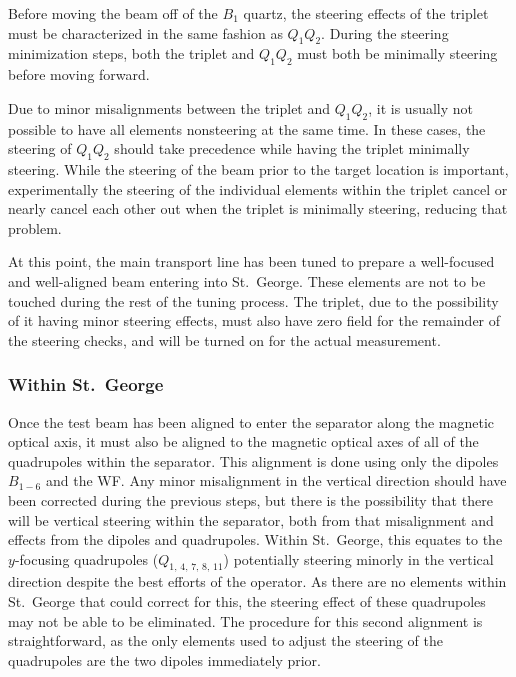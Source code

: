 Before moving the beam off of the $B_1$ quartz, the steering effects of
the triplet must be characterized in the same fashion as $Q_1Q_2$.
During the steering minimization steps, both the triplet and $Q_1Q_2$
must both be minimally steering before moving forward.

Due to minor misalignments between the triplet and $Q_1Q_2$, it is
usually not possible to have all elements nonsteering at the same time.
In these cases, the steering of $Q_1Q_2$ should take precedence while
having the triplet minimally steering. While the steering of the beam
prior to the target location is important, experimentally the steering
of the individual elements within the triplet cancel or nearly cancel
each other out when the triplet is minimally steering, reducing that
problem.

At this point, the main transport line has been tuned to prepare a
well-focused and well-aligned beam entering into St.\ George. These
elements are not to be touched during the rest of the tuning process.
The triplet, due to the possibility of it having minor steering effects,
must also have zero field for the remainder of the steering checks, and
will be turned on for the actual measurement.

\subsubsection{Within St.\ George}
\label{sec:tuning_stg}

Once the test beam has been aligned to enter the separator along the
magnetic optical axis, it must also be aligned to the magnetic optical
axes of all of the quadrupoles within the separator. This alignment is
done using only the dipoles $B_{1-6}$ and the WF. Any minor misalignment
in the vertical direction should have been corrected during the previous
steps, but there is the possibility that there will be vertical steering
within the separator, both from that misalignment and effects from the
dipoles and quadrupoles. Within St.\ George, this equates to the
$y$-focusing quadrupoles ($Q_{1,\,4,\,7,\,8,\,11}$) potentially steering
minorly in the vertical direction despite the best efforts of the
operator. As there are no elements within St.\ George that could correct
for this, the steering effect of these quadrupoles may not be able to be
eliminated. The procedure for this second alignment is straightforward,
as the only elements used to adjust the steering of the quadrupoles are
the two dipoles immediately prior.

